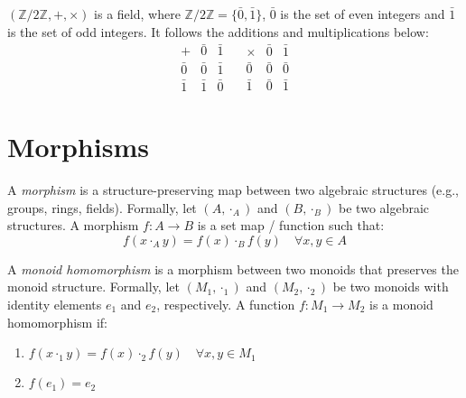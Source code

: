 \documentclass[11pt,fleqn]{book} %
\begin{document}
\begin{example}
    $(\mathbb{Z}/2\mathbb{Z}, +, \times)$ is a field, where $\mathbb{Z}/2\mathbb{Z} = \{\bar{0}, \bar{1}\}$, $\bar{0}$ is the set of even integers and $\bar{1}$ is the set of odd integers.
    It follows the additions and multiplications below:
    \begin{equation}
        \begin{array}{c|cc}
              + & \bar{0} & \bar{1} \\ \hline
            \bar{0} & \bar{0} & \bar{1} \\
            \bar{1} & \bar{1} & \bar{0}
        \end{array}
        \quad
        \begin{array}{c|cc}
              \times & \bar{0} & \bar{1} \\ \hline
            \bar{0} & \bar{0} & \bar{0} \\
            \bar{1} & \bar{0} & \bar{1}
        \end{array}
    \end{equation}
\end{example}

\newpage

\section{Morphisms}

\begin{definition}[Morphisms]
    A \emph{morphism} is a structure-preserving map between two algebraic structures (e.g., groups, rings, fields). Formally, let $(A, \cdot_A)$ and $(B, \cdot_B)$ be two algebraic structures. A morphism $f: A \to B$ is a set map / function such that:
    \[
        f(x \cdot_A y) = f(x) \cdot_B f(y) \quad \forall x, y \in A
    \]
\end{definition}

\begin{definition}
    A \emph{monoid homomorphism} is a morphism between two monoids that preserves the monoid structure. Formally, let $(M_1, \cdot_1)$ and $(M_2, \cdot_2)$ be two monoids with identity elements $e_1$ and $e_2$, respectively. A function $f: M_1 \to M_2$ is a monoid homomorphism if:
    \begin{enumerate}
        \item $f(x \cdot_1 y) = f(x) \cdot_2 f(y) \quad \forall x, y \in M_1$
        \item $f(e_1) = e_2$
    \end{enumerate}
\end{definition}
\end{document}
